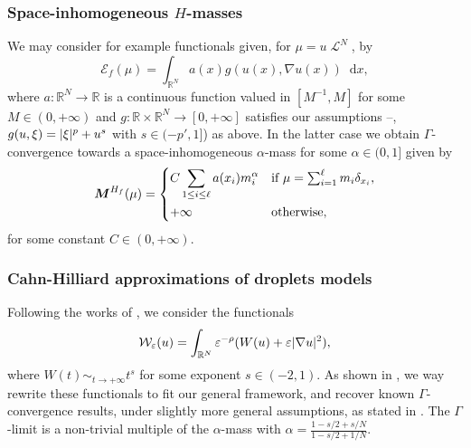 \documentclass[10pt]{amsart}
\theoremstyle{plain}
\theoremstyle{definition}
\newcommand{\dd}{\mathop{}\mathopen{}\mathrm{d}}
\newcommand{\R}{\mathbb{R}}
\newcommand{\ener}{\mathcal{E}}
\newcommand{\mass}{\boldsymbol{M}}
\newcommand{\eps}{\varepsilon}
\DeclarePairedDelimiter{\abs}{\lvert}{\rvert}
\DeclareMathOperator{\lbm}{\mathcal{L}}
\begin{document}
\subsubsection*{Space-inhomogeneous $H$-masses} We may consider for example functionals given, for $\mu = u\lbm^N$, by
\[\ener_f(\mu) = \int_{\R^N} a(x) g(u(x),\nabla u(x)) \dd x,\]
where $a : \R^N \to \R$ is a continuous function valued in $[M^{-1}, M]$ for some $M\in (0,+\infty)$ and $g : \R \times \R^N \to [0,+\infty]$ satisfies our assumptions --, \eg $g(u,\xi) = \abs{\xi}^p+ u^s$ with $s\in (-p',1]$) as above. In the latter case we obtain $\Gamma$-convergence towards a space-inhomogeneous $\alpha$-mass for some $\alpha \in (0,1]$ given by
\[\mass^{H_f}(\mu) = 
\begin{dcases*}
C \sum_{1\leq i\leq \ell} a(x_i) m_i^\alpha& if $\mu = \sum_{i=1}^\ell m_i \delta_{x_i}$,\\
+\infty & otherwise,
\end{dcases*}
\]
for some constant $C\in (0,+\infty)$.

\subsubsection*{Cahn-Hilliard approximations of droplets models} Following the works of \cite{bouchitteTransitionsPhasesAvec1996,dubsProblemesPerturbationsSingulieres1998}, we consider the functionals
\begin{equation}
\mathcal W_\eps(u) =
\int_{\R^N} \eps^{-\rho} (W(u) + \eps\abs{\nabla u}^2),
\end{equation}
where $W(t) \sim_{t\to+\infty} t^s$ for some exponent $s\in (-2,1)$. As shown in , we way rewrite these functionals to fit our general framework, and recover known $\Gamma$-convergence results, under slightly more general assumptions, as stated in . The $\Gamma$-limit is a non-trivial multiple of the $\alpha$-mass with $\alpha = \frac{1-s/2+s/N}{1-s/2+1/N}$.
\end{document}
